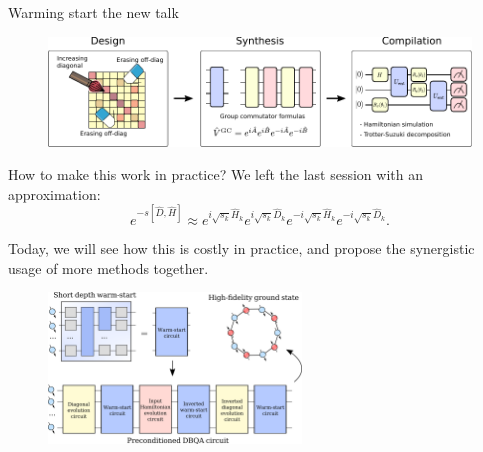 \documentclass[aspectratio=169, 8pt, xcolor={svgnames}]{beamer}
\begin{document}
\begin{frame}{Warming start the new talk}
\begin{figure}
   \includegraphics[width=1\textwidth]{figures/3_phases_dbqa.pdf}
\end{figure}
\end{frame}

\subtitle{\texttt{PART 2:} Interfacing DBQAs with other techniques}
\date{4 December 2024}

\begin{frame}{}
\maketitle
\end{frame}

\begin{frame}{How to make this work in practice?}
We left the last session with an approximation:
$$ e^{- s [\hat{D}, \hat{H}]} \approx e^{i \sqrt{s_k}\hat{H}_k} 
e^{i \sqrt{s_k}\hat{D}_k} e^{-i \sqrt{s_k}\hat{H}_k} e^{-i \sqrt{s_k}\hat{D}_k}.$$

Today, we will see how this is costly in practice, and propose the synergistic usage of 
more methods together.
\begin{figure}
   \includegraphics[width=0.6\textwidth]{figures/diagram.png}
\end{figure}
\end{frame}
\end{document}
